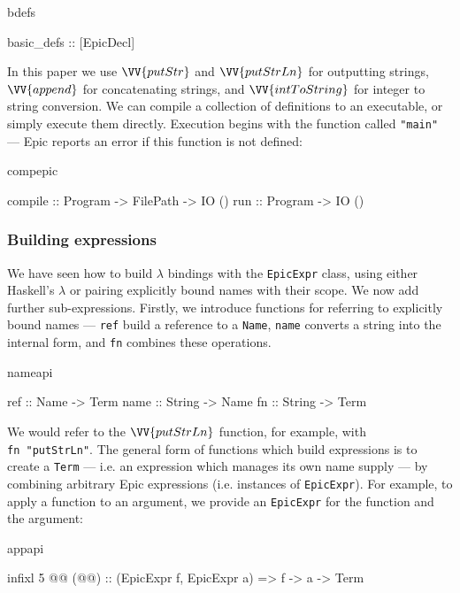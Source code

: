 \begin{SaveVerbatim}{bdefs}

basic_defs :: [EpicDecl]

\end{SaveVerbatim}

\noindent
In this paper we use $\VV{putStr}$ and $\VV{putStrLn}$ for outputting
strings, $\VV{append}$ for concatenating strings, and
$\VV{intToString}$ for integer to string conversion.
We can compile a collection of definitions to an executable, or simply
execute them directly. Execution begins with the function called
\texttt{"main"} --- Epic reports an error if this function is not
defined:

\begin{SaveVerbatim}{compepic}

compile :: Program -> FilePath -> IO ()
run     :: Program -> IO ()

\end{SaveVerbatim}

\subsubsection*{Building expressions}

We have seen how to build $\lambda$ bindings with the
\texttt{EpicExpr} class, using either Haskell's $\lambda$ or pairing
explicitly bound names with their scope. We now add further
sub-expressions. Firstly, we introduce functions for referring to
explicitly bound names --- \texttt{ref} build a reference to a
\texttt{Name}, \texttt{name} converts a string into the internal form,
and \texttt{fn} combines these operations.

\begin{SaveVerbatim}{nameapi}

ref  :: Name   -> Term
name :: String -> Name
fn   :: String -> Term

\end{SaveVerbatim}

\noindent
We would refer to the $\VV{putStrLn}$ function, for example, with
\texttt{fn~"putStrLn"}. 
The general form of functions which build expressions is to create a
\texttt{Term} --- i.e. an expression which manages its own name supply
--- by combining arbitrary Epic expressions (i.e. instances of
\texttt{EpicExpr}). For example, to apply a function to an argument,
we provide an \texttt{EpicExpr} for the function and the argument:

\begin{SaveVerbatim}{appapi}

infixl 5 @@
(@@) :: (EpicExpr f, EpicExpr a) => f -> a -> Term

\end{SaveVerbatim}

